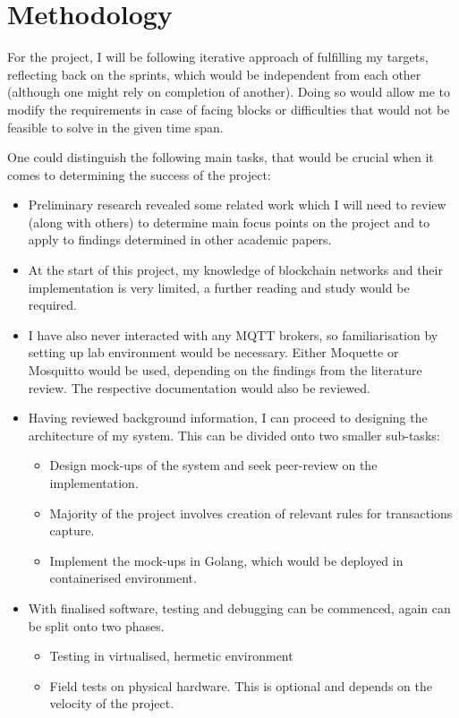 \documentclass[a4paper,12pt]{article}
\begin{document}
\section*{Methodology}

For the project, I will be following iterative approach of fulfilling my targets, reflecting back on the sprints, which would be independent from each other (although one might rely on completion of another). Doing so would allow me to modify the requirements in case of facing blocks or difficulties that would not be feasible to solve in the given time span.

One could distinguish the following main tasks, that would be crucial when it comes to determining the success of the project:
\begin{itemize}
  \item Preliminary research revealed some related work which I will need to review (along with others) to determine main focus points on the project and to apply to findings determined in other academic papers.
  \item At the start of this project, my knowledge of blockchain networks and their implementation is very limited, a further reading and study would be required.
  \item I have also never interacted with any MQTT brokers, so familiarisation by setting up lab environment would be necessary. Either Moquette or Mosquitto would be used, depending on the findings from the literature review. The respective documentation would also be reviewed.
  \item Having reviewed background information, I can proceed to designing the architecture of my system. This can be divided onto two smaller sub-tasks:
    \begin{itemize}
      \item Design mock-ups of the system and seek peer-review on the implementation.
      \item Majority of the project involves creation of relevant rules for transactions capture.
      \item Implement the mock-ups in Golang, which would be deployed in containerised environment.
    \end{itemize}
  \item With finalised software, testing and debugging can be commenced, again can be split onto two phases.
    \begin{itemize}
      \item Testing in virtualised, hermetic environment
      \item Field tests on physical hardware. This is optional and depends on the velocity of the project.
    \end{itemize}
\end{itemize}
\end{document}
